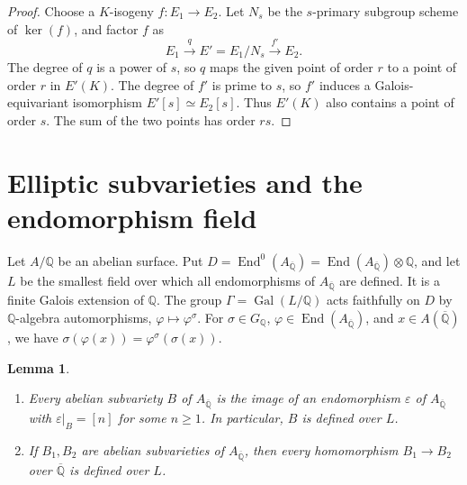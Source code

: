 \documentclass[11pt]{article}
\newtheorem{lemma}{Lemma}
\theoremstyle{remark}
\newcommand{\Q}{\mathbb Q}
\DeclareMathOperator{\End}{End}
\DeclareMathOperator{\Gal}{Gal}
\begin{document}
\begin{proof}
Choose a \(K\)-isogeny \(f:E_1\to E_2\). Let \(N_s\) be the
\(s\)-primary subgroup scheme of \(\ker(f)\), and factor \(f\) as
\[
 E_1\xrightarrow{\ q\ }E'=E_1/N_s\xrightarrow{\ f'\ }E_2.
\]
The degree of \(q\) is a power of \(s\), so \(q\) maps the given point
of order \(r\) to a point of order \(r\) in \(E'(K)\). The degree of
\(f'\) is prime to \(s\), so \(f'\) induces a Galois-equivariant
isomorphism \(E'[s]\simeq E_2[s]\). Thus \(E'(K)\) also contains a
point of order \(s\). The sum of the two points has order \(rs\).
\end{proof}

\section{Elliptic subvarieties and the endomorphism field}\label{sec:subvarieties}

Let \(A/\Q\) be an abelian surface. Put
\(D=\End^0(A_{\overline{\Q}})=\End(A_{\overline{\Q}})\otimes\Q\), and
let \(L\) be the smallest field over which all endomorphisms of
\(A_{\overline{\Q}}\) are defined. It is a finite Galois extension of
\(\Q\). The group \(\Gamma=\Gal(L/\Q)\) acts faithfully on \(D\) by
\(\Q\)-algebra automorphisms, \(\varphi\mapsto\varphi^\sigma\). For
\(\sigma\in G_{\Q}\), \(\varphi\in\End(A_{\overline{\Q}})\), and
\(x\in A(\overline{\Q})\), we have
\(\sigma(\varphi(x))=\varphi^\sigma(\sigma(x))\).

\begin{lemma}\label{lem:subvarieties}
\begin{enumerate}
\item[(a)] Every abelian subvariety \(B\) of \(A_{\overline{\Q}}\) is
the image of an endomorphism \(\varepsilon\) of \(A_{\overline{\Q}}\)
with \(\varepsilon|_B=[n]\) for some \(n\geq1\). In particular,
\(B\) is defined over \(L\).
\item[(b)] If \(B_1,B_2\) are abelian subvarieties of
\(A_{\overline{\Q}}\), then every homomorphism \(B_1\to B_2\) over
\(\overline{\Q}\) is defined over \(L\).
\end{enumerate}
\end{lemma}
\end{document}
